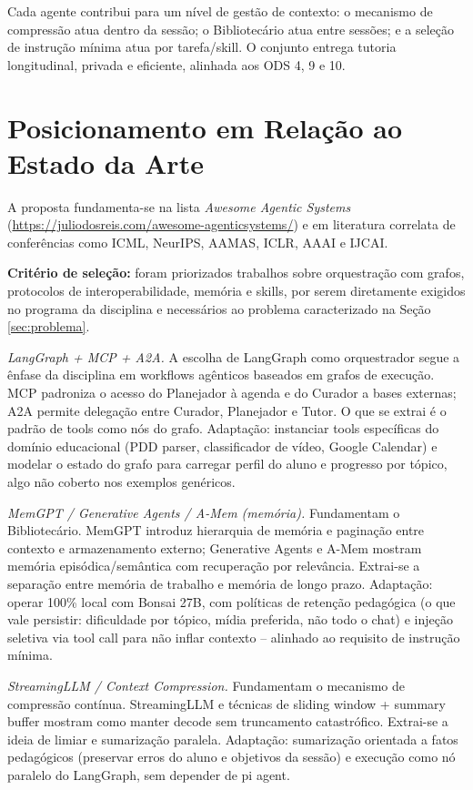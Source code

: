 \documentclass[12pt]{article}
\begin{document}
Cada agente contribui para um nível de gestão de contexto: o mecanismo de compressão atua dentro da sessão; o Bibliotecário atua entre sessões; e a seleção de instrução mínima atua por tarefa/skill. O conjunto entrega tutoria longitudinal, privada e eficiente, alinhada aos ODS 4, 9 e 10.

\section{Posicionamento em Relação ao Estado da Arte}
\label{sec:estado_da_arte}

A proposta fundamenta-se na lista \textit{Awesome Agentic Systems} (\url{https://juliodosreis.com/awesome-agenticsystems/}) e em literatura correlata de conferências como ICML, NeurIPS, AAMAS, ICLR, AAAI e IJCAI.

\textbf{Critério de seleção:} foram priorizados trabalhos sobre orquestração com grafos, protocolos de interoperabilidade, memória e skills, por serem diretamente exigidos no programa da disciplina e necessários ao problema caracterizado na Seção \ref{sec:problema}.

\textit{LangGraph + MCP + A2A.} A escolha de LangGraph como orquestrador segue a ênfase da disciplina em workflows agênticos baseados em grafos de execução. MCP padroniza o acesso do Planejador à agenda e do Curador a bases externas; A2A permite delegação entre Curador, Planejador e Tutor. O que se extrai é o padrão de tools como nós do grafo. Adaptação: instanciar tools específicas do domínio educacional (PDD parser, classificador de vídeo, Google Calendar) e modelar o estado do grafo para carregar perfil do aluno e progresso por tópico, algo não coberto nos exemplos genéricos.

\textit{MemGPT / Generative Agents / A-Mem (memória).} Fundamentam o Bibliotecário. MemGPT introduz hierarquia de memória e paginação entre contexto e armazenamento externo; Generative Agents e A-Mem mostram memória episódica/semântica com recuperação por relevância. Extrai-se a separação entre memória de trabalho e memória de longo prazo. Adaptação: operar 100\% local com Bonsai 27B, com políticas de retenção pedagógica (o que vale persistir: dificuldade por tópico, mídia preferida, não todo o chat) e injeção seletiva via tool call para não inflar contexto -- alinhado ao requisito de instrução mínima.

\textit{StreamingLLM / Context Compression.} Fundamentam o mecanismo de compressão contínua. StreamingLLM e técnicas de sliding window + summary buffer mostram como manter decode sem truncamento catastrófico. Extrai-se a ideia de limiar e sumarização paralela. Adaptação: sumarização orientada a fatos pedagógicos (preservar erros do aluno e objetivos da sessão) e execução como nó paralelo do LangGraph, sem depender de pi agent.
\end{document}
